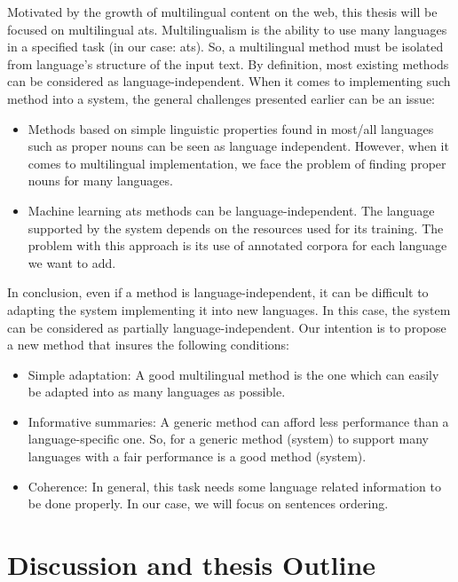 Motivated by the growth of multilingual content on the web, this thesis will be focused on multilingual \ac{ats}.
Multilingualism is the ability to use many languages in a specified task (in our case: \ac{ats}).
So, a multilingual method must be isolated from language's structure of the input text. 
By definition, most existing methods can be considered as language-independent. 
When it comes to implementing such method into a system, the general challenges presented earlier can be an issue:
\begin{itemize}
	\item Methods based on simple linguistic properties found in most/all languages such as proper nouns can be seen as language independent.
	However, when it comes to multilingual implementation, we face the problem of finding proper nouns for many languages. 
	\item Machine learning \ac{ats} methods can be language-independent.
	The language supported by the system depends on the resources used for its training. 
	The problem with this approach is its use of annotated corpora for each language we want to add. 
	
\end{itemize}

In conclusion, even if a method is language-independent, it can be difficult to adapting the system implementing it into new languages.
In this case, the system can be considered as partially language-independent. 
Our intention is to propose a new method that insures the following conditions:
\begin{itemize}
	\item Simple adaptation: 
	A good multilingual method is the one which can easily be adapted into as many languages as possible. 
	
	\item Informative summaries: 
	A generic method can afford less performance than a language-specific one. 
	So, for a generic method (system) to support many languages with a fair performance is a good method (system). 
	
	\item Coherence: In general, this task needs some language related information to be done properly. 
	In our case, we will focus on sentences ordering.
	
\end{itemize}


\section{Discussion and thesis Outline}

